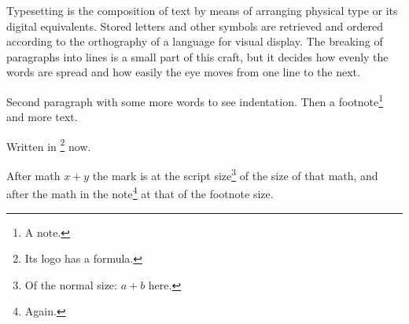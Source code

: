 \documentclass{amsart}
\begin{document}
Typesetting is the composition of text by means of arranging physical type or its digital equivalents. Stored letters and other symbols are retrieved and ordered according to the orthography of a language for visual display. The breaking of paragraphs into lines is a small part of this craft, but it decides how evenly the words are spread and how easily the eye moves from one line to the next.

Second paragraph with some more words to see indentation. Then a footnote\footnote{A note.} and more text.

Written in \LaTeXe\footnote{Its logo has a formula.} now.

After math $x+y$ the mark is at the script size\footnote{Of the normal size: $a+b$ here.} of the size of that math, and after the math in the note\footnote{Again.} at that of the footnote size.
\end{document}
